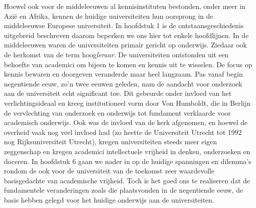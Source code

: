 \documentclass[smallauthor, chapterhaspagenum, nochapterinheader, pagenuminheader,  bigchapnum,medium2, tocpages, garamond, titleinheader]{jote-book}
\begin{document}
	Hoewel ook voor de middeleeuwen al kennisinstituten bestonden, onder meer in Azië en Afrika, kennen de huidige universiteiten hun oorsprong in de middeleeuwse Europese universiteit. In hoofdstuk 1 is de ontstaansgeschiedenis uitgebreid beschreven daarom beperken we ons hier tot enkele hoofdlijnen. In de middeleeuwen waren de universiteiten primair gericht op onderwijs. Ziedaar ook de herkomst van de term hoog\emph{leraar}. De universiteiten ontstonden uit een behoefte van academici om bijeen te komen en kennis uit te wisselen. De focus op kennis bewaren en doorgeven veranderde maar heel langzaam. Pas vanaf begin negentiende eeuw, zo'n twee eeuwen geleden, nam de aandacht voor onderzoek aan de universiteit echt significant toe. Dit gebeurde onder invloed van het verlichtingsideaal en kreeg institutioneel vorm door Von Humboldt, die in Berlijn de vervlechting van onderzoek en onderwijs tot fundament verklaarde voor academisch onderwijs. Ook was de invloed van de kerk afgenomen, en hoewel de overheid vaak nog veel invloed had (zo heette de Universiteit Utrecht tot 1992 nog Rijksuniversiteit Utrecht), kregen universiteiten steeds meer eigen zeggenschap en kregen academici intellectuele vrijheid in denken, onderzoeken en doceren. In hoofdstuk 6 gaan we nader in op de huidige spanningen en dilemma's rondom de ook voor de universiteit van de toekomst zeer waardevolle basisgedachte van academische vrijheid. Toch is het goed ons te realiseren dat de fundamentele veranderingen zoals die plaatsvonden in de negentiende eeuw, de basis hebben gelegd voor het huidige onderwijs aan de universiteiten.
\end{document}
